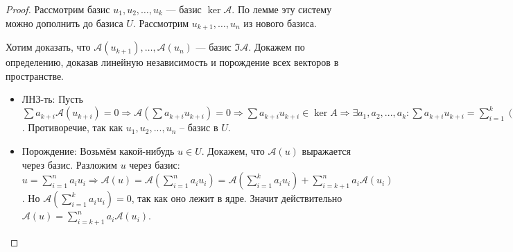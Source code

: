 \begin{proof}
    Рассмотрим базис $u_1, u_2, \ldots, u_k$ --- базис $\ker \mathcal{A}$. По лемме эту систему можно дополнить до базиса  $U$. Рассмотрим $u_{k+1}, \ldots, u_n$ из нового базиса. 

    Хотим доказать, что $\mathcal{A}(u_{k+1}), \ldots, \mathcal{A}(u_n)$ --- базис $\Im \mathcal{A}$. Докажем по определению, доказав линейную независимость и порождение всех векторов в пространстве.

    \begin{itemize}
        \item ЛНЗ-ть: Пусть  $\sum a_{k + i} \mathcal{A}(u_{k+i}) = 0 \Rightarrow \mathcal{A}(\sum a_{k+i} u_{k+i}) = 0 \Rightarrow \sum a_{k+i} u_{k+i} \in \ker A \Rightarrow \exists a_1, a_2, ..., a_k : \sum a_{k + i} u_{k + i} = \sum\limits_{i=1}^k (-a_i) u_i \Rightarrow \sum\limits_{i=1}^n a_i u_i = 0$. Противоречие, так как $u_1, u_2, ..., u_n$ -- базис в $U$.
        \item Порождение: Возьмём какой-нибудь $u \in U$. Докажем, что $\mathcal{A}(u)$ выражается через базис. Разложим $u$ через базис: $u = \sum\limits_{i = 1}^n a_i u_i \Rightarrow \mathcal{A}(u) = \mathcal{A}\left(\sum\limits_{i = 1}^n a_i u_i\right) = \mathcal{A}\left(\sum\limits_{i=1}^k a_i u_i\right) + \sum\limits_{i=k+1}^n a_i \mathcal{A}(u_i)$. Но $\mathcal{A}\left(\sum\limits_{i=1}^k a_i u_i\right) = 0$, так как оно лежит в ядре. Значит действительно $\mathcal{A}(u) = \sum\limits_{i=k+1}^n a_i \mathcal{A}(u_i)$.
    \end{itemize}
\end{proof}

